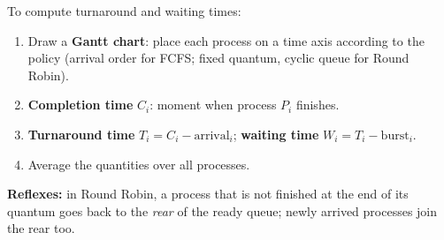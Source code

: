 \documentclass[11pt]{article}
\begin{document}
\begin{methode}
To compute turnaround and waiting times:
\begin{enumerate}
\item Draw a \textbf{Gantt chart}: place each process on a time axis according to the policy (arrival order for FCFS; fixed quantum, cyclic queue for Round Robin).
\item \textbf{Completion time} $C_i$: moment when process $P_i$ finishes.
\item \textbf{Turnaround time} $T_i = C_i - \text{arrival}_i$; \textbf{waiting time} $W_i = T_i - \text{burst}_i$.
\item Average the quantities over all processes.
\end{enumerate}
\textbf{Reflexes:} in Round Robin, a process that is not finished at the end of its quantum goes back to the \emph{rear} of the ready queue; newly arrived processes join the rear too.
\end{methode}
\end{document}

